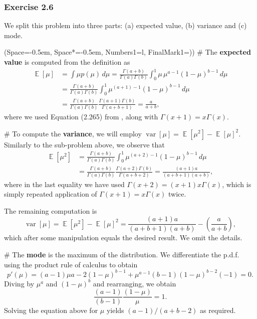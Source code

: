 \documentclass[12pt, a4paper]{article}
\newcommand{\listSpace}{-0.5em}%
\DeclareMathOperator{\E}{\mathbb{E}}
\DeclareMathOperator{\var}{\operatorname{var}}
\begin{document}
\subsubsection*{Exercise 2.6}
We split this problem into three parts: (a) expected value, (b) variance and (c) mode.
\begin{easylist}[enumerate]
	\ListProperties(Space=\listSpace, Space*=\listSpace, Numbers1=l, FinalMark1={)})
	# The \textbf{expected value} is computed from the definition as
	\begin{align*}
		\E[\mu] &= \int \mu p(\mu) \, d\mu =  \frac{\Gamma(a + b)}{\Gamma(a ) \Gamma( b)} \int_0^1 \mu \, \mu^{a-1} (1- \mu)^{b-1} \, d\mu \\
		&= \frac{\Gamma(a + b)}{\Gamma(a ) \Gamma( b)} \int_0^1  \mu^{(a+1)-1} (1- \mu)^{b-1} \, d\mu \tag{re-cast as Beta} \\ 
		&= \frac{\Gamma(a + b)}{\Gamma(a ) \Gamma( b)} \frac{\Gamma(a +1 ) \Gamma( b)}{\Gamma(a + b + 1)} = \frac{a}{a + b},
	\end{align*}
	where we used Equation (2.265) from \cite{bishop_pattern_2011}, along with $\Gamma(x+1) = x\Gamma(x)$.
	
	# To compute the \textbf{variance}, we will employ $\var[\mu] = \E[\mu^2] - \E[\mu]^2$.
	Similarly to the sub-problem above, we observe that
	\begin{align*}
	\E[\mu^2] &= \frac{\Gamma(a + b)}{\Gamma(a ) \Gamma( b)} \int_0^1  \mu^{(a+2)-1} (1- \mu)^{b-1} \, d\mu \\
	&= \frac{\Gamma(a + b)}{\Gamma(a ) \Gamma( b)} \frac{\Gamma(a +2 ) \Gamma( b)}{\Gamma(a + b + 2)}
	= \frac{(a+1) a}{(a + b +1) (a+b)},
	\end{align*}
	where in the last equality we have used $\Gamma(x+2) = (x+1)x \Gamma(x)$, which is simply repeated application of $\Gamma(x+1) = x\Gamma(x)$ twice.
	
	The remaining computation is
	\begin{equation*}
		\var[\mu] = \E[\mu^2] - \E[\mu]^2 = \frac{(a+1) a}{(a + b +1) (a+b)} - \left( \frac{a}{a + b} \right),
	\end{equation*}
	which after some manipulation equals the desired result.
	We omit the details.
	
	# The \textbf{mode} is the maximum of the distribution.
	We differentiate the p.d.f. using the product rule of calculus to obtain
	\begin{equation*}
		p'(\mu) = (a-1) \mu{a-2} (1-\mu)^{b-1}
		+
		\mu^{a-1} (b-1) (1-\mu)^{b-2}(-1) = 0.
	\end{equation*}
	Diving by $\mu^a$ and $(1-\mu)^b$ and rearranging, we obtain
	\begin{equation*}
		\frac{(a-1)}{(b-1)} \frac{(1 - \mu)}{\mu} = 1.
	\end{equation*}
	Solving the equation above for $\mu$ yields  $(a-1) / (a + b - 2)$ as required.
\end{easylist}
\end{document}
